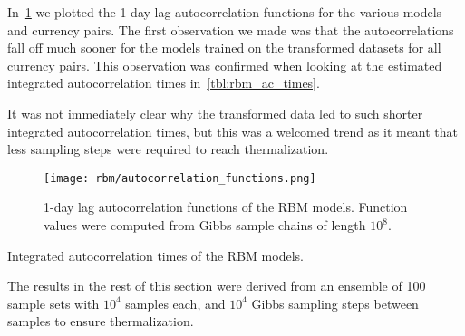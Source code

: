In~\cref{fig:rbm_autocorrelation_functions} we plotted the 1-day lag autocorrelation functions for the various models and currency pairs.
The first observation we made was that the autocorrelations fall off much sooner for the models trained on the transformed datasets for all currency pairs.
This observation was confirmed when looking at the estimated integrated autocorrelation times in~\cref{tbl:rbm_ac_times}.

It was not immediately clear why the transformed data led to such shorter integrated autocorrelation times, but this was a welcomed trend as it meant that less sampling steps were required to reach thermalization.
\begin{figure}[!htb]
    \begin{center}
        \texttt{[image: rbm/autocorrelation\_functions.png]}
    \end{center}
    \caption{1-day lag autocorrelation functions of the RBM models. Function values were computed from Gibbs sample chains of length \( 10^8 \).}
    \label{fig:rbm_autocorrelation_functions}
\end{figure}
\begin{table}[!htb]
    \centering
    \begin{adjustbox}{max width=\textwidth}
        
    \end{adjustbox}
    \caption{Integrated autocorrelation times of the RBM models.}
    \label{tbl:rbm_ac_times}
\end{table}

The results in the rest of this section were derived from an ensemble of 100 sample sets with \( 10^4 \) samples each, and \( 10^4 \) Gibbs sampling steps between samples to ensure thermalization.

